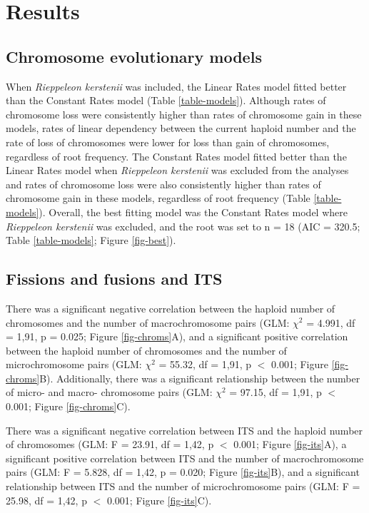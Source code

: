\documentclass[a4paper, 12pt]{article}
\begin{document}
\section{Results}

\subsection{Chromosome evolutionary models}
When \textit{Rieppeleon kerstenii} was included, the Linear Rates model fitted better than the Constant Rates model (Table \ref{table-models}).
Although rates of chromosome loss were consistently higher than rates of chromosome gain in these models, rates of linear dependency between the current haploid number and the rate of loss of chromosomes were lower for loss than gain of chromosomes, regardless of root frequency. 
The Constant Rates model fitted better than the Linear Rates model when \textit{Rieppeleon kerstenii} was excluded from the analyses and rates of chromosome loss were also consistently higher than rates of chromosome gain in these models, regardless of root frequency (Table \ref{table-models}). 
Overall, the best fitting model was the Constant Rates model where \textit{Rieppeleon kerstenii} was excluded, and the root was set to n = 18 (AIC = 320.5; Table \ref{table-models}; Figure \ref{fig-best}).


\subsection{Fissions and fusions and ITS}
There was a significant negative correlation between the haploid number of chromosomes and the number of macrochromosome pairs (GLM: $\chi^2$ = 4.991, df = 1,91, p = 0.025; Figure \ref{fig-chroms}A), and a significant positive correlation between the haploid number of chromosomes and the number of microchromosome pairs (GLM: $\chi^2$ = 55.32, df = 1,91, p $<$ 0.001; Figure \ref{fig-chroms}B). 
Additionally, there was a significant relationship between the number of micro- and macro- chromosome pairs (GLM: $\chi^2$ = 97.15, df = 1,91, p $<$ 0.001; Figure \ref{fig-chroms}C). 

There was a significant negative correlation between ITS and the haploid number of chromosomes (GLM: F = 23.91, df = 1,42, p $<$ 0.001; Figure \ref{fig-its}A), a significant positive correlation between ITS and the number of macrochromosome pairs (GLM: F = 5.828, df = 1,42, p = 0.020; Figure \ref{fig-its}B), and a significant relationship between ITS and the number of microchromosome pairs (GLM: F = 25.98, df = 1,42, p $<$ 0.001; Figure \ref{fig-its}C). 
\end{document}
